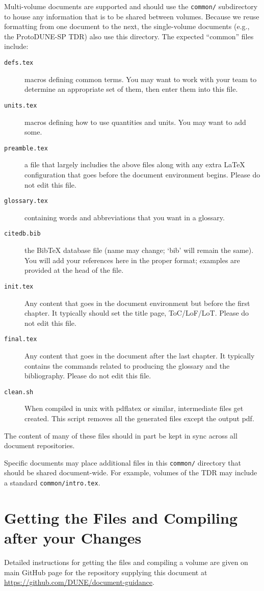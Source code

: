 Multi-volume documents are supported and should use the
\texttt{common/} subdirectory to house any information that is to be
shared between volumes.
Because we reuse formatting from one document to the next, the single-volume documents (e.g., the ProtoDUNE-SP TDR) also use this directory.
The expected ``common'' files include:
\begin{description}
\item[\texttt{defs.tex}] macros defining common terms. You may want to work with your team to determine an appropriate set of them, then enter them into this file.
\item[\texttt{units.tex}] macros defining how to use quantities and units. You may want to add some. 
\item[\texttt{preamble.tex}] a file that largely includies the above files along with
  any extra \LaTeX{} configuration that goes before the document
  environment begins.  Please do not edit this file.
\item[\texttt{glossary.tex}] containing words and abbreviations that you want in a glossary.
\item[\texttt{citedb.bib}] the BibTeX database file (name may change; `bib' will remain the same). You will add your references here in the proper format; examples are provided at the head of the file.
\item[\texttt{init.tex}] Any content that goes in the document
  environment but before the first chapter. 
  It typically should set the title page, ToC/LoF/LoT. Please do not edit this file.
\item[\texttt{final.tex}] Any content that goes in the document after
  the last chapter. 
  It typically contains the commands related to producing the glossary and the
  bibliography.  Please do not edit this file.
  \item[\texttt{clean.sh}] When compiled in unix with pdflatex or similar, intermediate files get created. This script removes all the generated files except the output pdf.
\end{description}

The content of many of these files should in part be kept in sync
across all document repositories.

Specific documents may place additional files in this \texttt{common/}
directory that should be shared document-wide.
For example, volumes of the TDR may include a standard \texttt{common/intro.tex}.

\section{Getting the Files and Compiling after your Changes}
\label{sec:tech-compile}

Detailed instructions for getting the files and compiling a volume are
given on main GitHub page for the repository supplying this document at
\url{https://github.com/DUNE/document-guidance}.
  

